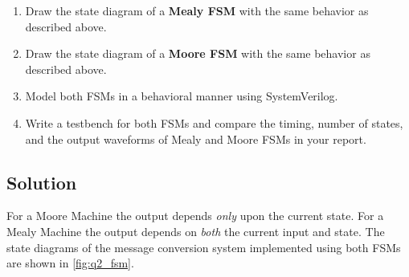 \documentclass[../main.tex]{subfiles}
\begin{document}
\begin{enumerate}
    \item Draw the state diagram of a \textbf{Mealy FSM} with the same behavior as described above.
    \item Draw the state diagram of a \textbf{Moore FSM} with the same behavior as described above.
    \item Model both FSMs in a behavioral manner using SystemVerilog.
    \item Write a testbench for both FSMs and compare the timing, number of states, and the output waveforms of Mealy and Moore FSMs in your report.
\end{enumerate}

\subsection*{Solution}

For a Moore Machine the output depends \textit{only} upon the current state. For a Mealy Machine the output depends on \textit{both} the current input and state. The state diagrams of the message conversion system implemented using both FSMs are shown in \cref{fig:q2_fsm}.
\end{document}
